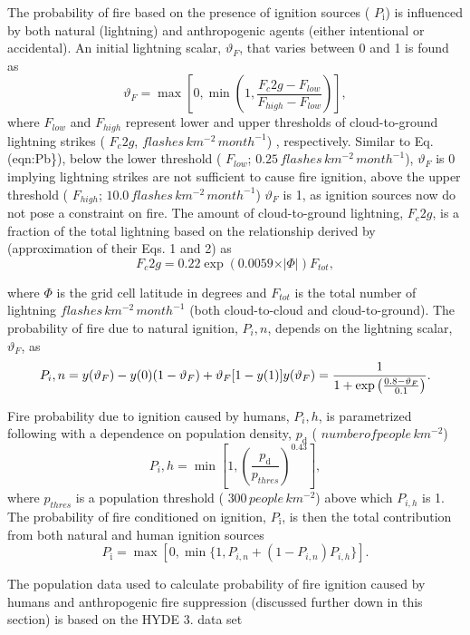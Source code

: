 The probability of fire based on the presence of ignition sources ( $P_\mathrm{i}$) is influenced by both natural (lightning) and anthropogenic agents (either intentional or accidental). An initial lightning scalar, $\vartheta_F$, that varies between 0 and 1 is found as \[ \vartheta_F = \max\left[0, \min \left(1,\frac{F_c2g - F_{low}}{F_{high} - F_{low}} \right)\right],\] where $F_{low}$ and $F_{high}$ represent lower and upper thresholds of cloud-\/to-\/ground lightning strikes ( $F_c2g$, $flashes\,km^{-2}\,month^{-1}$) , respectively. Similar to Eq. (eqn\+:Pb\}), below the lower threshold ( $F_{low}$; $0.25\,flashes\,km^{-2}\,month^{-1}$), $\vartheta_F$ is 0 implying lightning strikes are not sufficient to cause fire ignition, above the upper threshold ( $F_{high}$; $10.0\,flashes\,km^{-2}\,month^{-1}$) $\vartheta_F$ is 1, as ignition sources now do not pose a constraint on fire. The amount of cloud-\/to-\/ground lightning, $F_c2g$, is a fraction of the total lightning based on the relationship derived by \cite{Price1993-fm} (approximation of their Eqs. 1 and 2) as \[ F_c2g = 0.22 \exp (0.0059 \times \vert {\Phi}\vert) F_{tot},\]

where $\Phi$ is the grid cell latitude in degrees and $F_{tot}$ is the total number of lightning $flashes\,km^{-2}\,month^{-1}$ (both cloud-\/to-\/cloud and cloud-\/to-\/ground). The probability of fire due to natural ignition, $P_i,n$, depends on the lightning scalar, $\vartheta_F$, as \[ P_i,n = y(\vartheta_F) - y(0)(1 - \vartheta_F) + \vartheta_F[1-y(1)] \nonumber\\ y(\vartheta_F) = \frac{1}{1 + \exp\left(\frac{0.8 - \vartheta_F}{0.1}\right)}. \]

Fire probability due to ignition caused by humans, $P_i,h$, is parametrized following \cite{Kloster2010-633} with a dependence on population density, $p_\mathrm{d}$ ( $number of people\,km^{-2}$) \[ \label{eqn:Ph} P_i,h = \min\left[1,\left(\frac{p_\mathrm{d}}{p_{thres}}\right)^{0.43}\right], \] where $p_{thres}$ is a population threshold ( $300\,people\,km^{-2}$) above which $P_{i,h}$ is 1. The probability of fire conditioned on ignition, $P_\mathrm{i}$, is then the total contribution from both natural and human ignition sources \[ \label{eqn:Pi} P_\mathrm{i} = \max[0, \min\{1, P_{i,n} + (1 - P_{i,n})P_{i,h}\}]. \]

The population data used to calculate probability of fire ignition caused by humans and anthropogenic fire suppression (discussed further down in this section) is based on the H\+Y\+D\+E 3. data set \cite{Klein_Goldewijk2010-lh}

